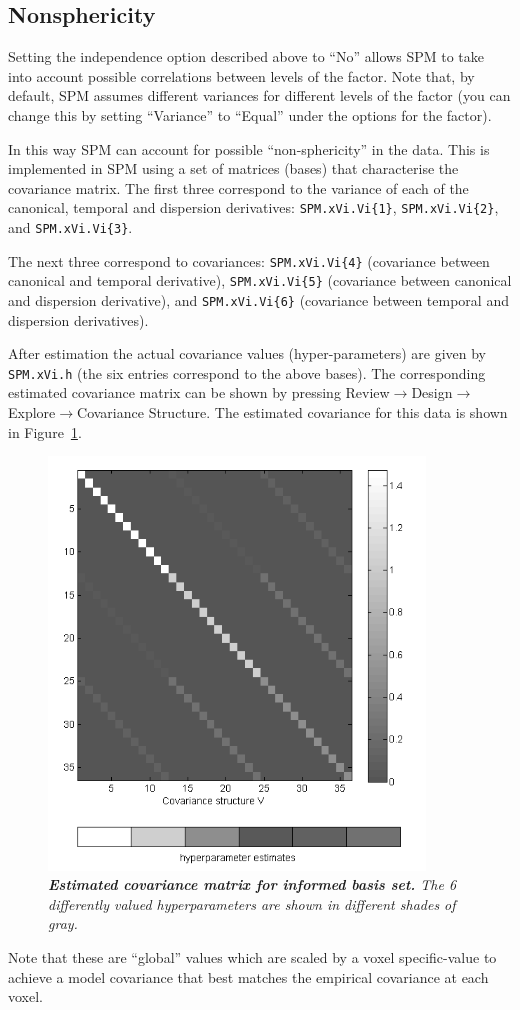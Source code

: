 \subsection{Nonsphericity}

Setting the independence option described above to ``No'' allows SPM to take into account possible correlations between levels of the factor. Note that, by default, SPM assumes different variances for different levels of the factor (you can change this by setting ``Variance'' to ``Equal'' under the options for the factor). 

In this way SPM can account for possible ``non-sphericity'' in the data. This is implemented in SPM using a set of matrices (bases) that characterise the covariance matrix. The first three correspond to the variance of each of the canonical, temporal and dispersion derivatives:  \texttt{SPM.xVi.Vi\{1\}}, \texttt{SPM.xVi.Vi\{2\}}, and \texttt{SPM.xVi.Vi\{3\}}.

The next three correspond to covariances: \texttt{SPM.xVi.Vi\{4\}} (covariance between canonical and temporal derivative), \texttt{SPM.xVi.Vi\{5\}} (covariance between canonical and dispersion derivative), and \texttt{SPM.xVi.Vi\{6\}} (covariance between temporal and dispersion derivatives).

After estimation the actual covariance values (hyper-parameters) are given by \texttt{SPM.xVi.h} (the six entries correspond to the above bases). The corresponding estimated covariance matrix can be shown by pressing Review$\rightarrow$Design$\rightarrow$Explore$\rightarrow$Covariance Structure. The estimated covariance for this data is shown in Figure~\ref{informed_covariance}.
\begin{figure}
\begin{center}
\includegraphics[width=100mm]{faces_group/informed_covariance}
\caption{\em \textbf{Estimated covariance matrix for informed basis set.} The 6 differently valued hyperparameters are shown in different shades of gray. \label{informed_covariance}}
\end{center}
\end{figure}
Note that these are ``global'' values which are scaled by a voxel specific-value to achieve a model covariance that best matches the empirical covariance at each voxel. 

